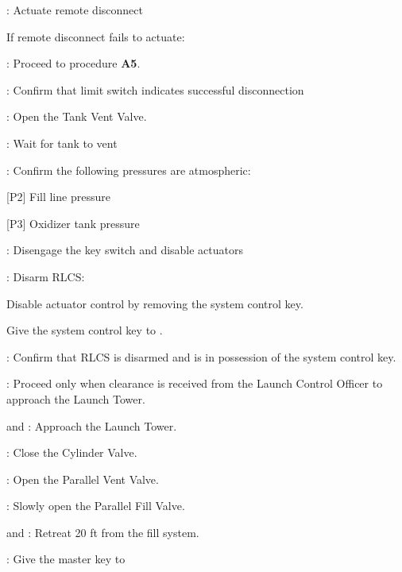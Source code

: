 \begin{checklist}
    \item \control{}: Actuate remote disconnect
        \begin{checklist}[label=$\bullet$]
        \item If remote disconnect fails to actuate:
        \begin{checklist}
            \item \ops{}: Proceed to procedure \textbf{A5}.
        \end{checklist}
    \end{checklist}
    \item \control{}: Confirm that limit switch indicates successful disconnection
    \item \control{}: Open the Tank Vent Valve.
    \item \ops{}: Wait for tank to vent 
    \item \control{}: Confirm the following pressures are atmospheric:
    \begin{checklist}
        \item {[P2]} Fill line pressure
        \item {[P3]} Oxidizer tank pressure
    \end{checklist}
    \item \control{}: Disengage the key switch and disable actuators
    \item \control{}: Disarm RLCS:
    \begin{checklist}
        \item Disable actuator control by removing the system control key.
        \item Give the system control key to \ops{}.
    \end{checklist}
    \item \ops: Confirm that RLCS is disarmed and \ops{} is in possession of the system control  key.
    \item \ops{}: Proceed only when clearance is received from the Launch Control Officer to approach the Launch Tower.
    \item \primary{} and \secondary: Approach the Launch Tower.
    \item \primary{}: Close the Cylinder Valve.
    \item \primary{}: Open the Parallel Vent Valve.
    \item \primary{}: Slowly open the Parallel Fill Valve.
    \item \primary{} and \secondary: Retreat 20 ft from the fill system.
    \item \ops: Give the master key to \control{}

\end{checklist}
